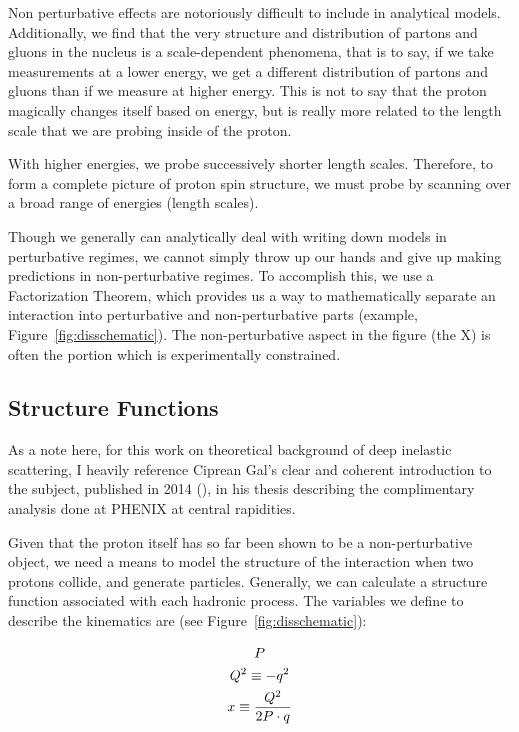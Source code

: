 Non perturbative effects are notoriously difficult to include in analytical
models. Additionally, we find that the very structure and distribution of
partons and gluons in the nucleus is a scale-dependent phenomena, that is to
say, if we take measurements at a lower energy, we get a different distribution
of partons and gluons than if we measure at higher energy. This is not to say
that the proton magically changes itself based on energy, but is really more
related to the length scale that we are probing inside of the proton. 

With higher energies, we probe successively shorter length scales. Therefore, to
form a complete picture of proton spin structure, we must probe by scanning over
a broad range of energies (length scales).

Though we generally can analytically deal with writing down models in
perturbative regimes, we cannot simply throw up our hands and give up making
predictions in non-perturbative regimes. To accomplish this, we use a
Factorization Theorem, which provides us a way to mathematically separate an
interaction into perturbative and non-perturbative parts (example,
Figure~\ref{fig:disschematic}). The non-perturbative aspect in the figure (the
X) is often the portion which is experimentally constrained.

\subsection{Structure Functions}

As a note here, for this work on theoretical background of deep inelastic
scattering, I heavily reference Ciprean Gal's clear and coherent introduction to
the subject, published in 2014 (\cite{Gal2014b}), in his thesis describing the
complimentary analysis done at PHENIX at central rapidities.

Given that the proton itself has so far been shown to be a non-perturbative
object, we need a means to model the structure of the interaction when two
protons collide, and generate particles.  Generally, we can calculate a
structure function associated with each hadronic process. The variables we
define to describe the kinematics are (see Figure~\ref{fig:disschematic}):

\begin{gather}
  P \label{eq:P}\\
  Q^2 \equiv -q^2 \label{eq:big_q_sq}\\
    x \equiv { Q^2 \over {2P\cdot q} } \label{eq:x}
\end{gather}

